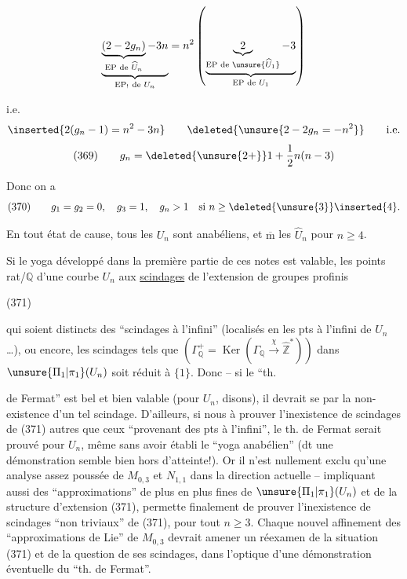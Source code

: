 

\[
\underbrace{\underbrace{(2-2g_n)}_{\text{EP de }\widehat U_n}-3n}_{\text{EP}_{!}\text{ de }U_n}
=n^2\left(\underbrace{\underbrace{2}_{\text{EP de }\unsure{\widehat U_1}}-3}_{\text{EP de }U_1}\right)
\]

i.e.
\[
\inserted{2(g_n-1)=n^2-3n}
\qquad
\deleted{\unsure{2-2g_n=-n^2}}
\qquad \text{i.e.}
\]
\[
\text{(369)}\qquad g_n=\deleted{\unsure{2+}}1+\frac12 n(n-3)
\]

Donc on a
\[
\text{(370)}\qquad g_1=g_2=0,\quad g_3=1,\quad g_n>1\quad\text{si }n\geq\deleted{\unsure{3}}\inserted{4}.
\]

En tout état de cause, tous les $U_n$ sont anabéliens, et $\overline{\mathrm m}$ les $\widehat U_n$ pour $n\geq4$.

Si le yoga  développé dans la première partie de ces notes est valable, les   points rat/$\mathbb Q$ d'une courbe $U_n$   aux \uline{scindages} de l'extension de groupes profinis

\noindent (371)

qui soient distincts des ``scindages à l'infini'' (localisés en les  pts à l'infini de $U_n$\ldots), ou encore, les scindages tels que  $(\Gamma_{\mathbb Q}^{+}=\operatorname{Ker}(\Gamma_{\mathbb Q}\xrightarrow{\chi}\widehat{\mathbb Z}^{*}))$ dans $\unsure{\Pi_1|\pi_1}(U_n)$ soit réduit à $\{1\}$. Donc -- si le ``th.


de Fermat'' est bel et bien valable (pour $U_n$, disons), il devrait se  par la non-existence d'un tel scindage. D'ailleurs, si nous  à prouver l'inexistence de scindages de (371) autres que ceux ``provenant des pts à l'infini'', le th. de Fermat serait prouvé pour $U_n$, même sans avoir établi le ``yoga anabélien'' (dt une démonstration semble bien hors d'atteinte!). Or il n'est nullement exclu qu'une analyse assez poussée de $M_{0,3}$ et $N_{1,1}$ dans la direction actuelle -- impliquant aussi des ``approximations'' de plus en plus fines de $\unsure{\Pi_1|\pi_1}(U_n)$ et de la structure d'extension (371), permette finalement de prouver l'inexistence de scindages ``non triviaux'' de (371), pour tout $n\geq3$. Chaque nouvel affinement des ``approximations de Lie'' de $M_{0,3}$ devrait amener un réexamen de la situation (371) et de la question de ses scindages, dans l'optique d'une démonstration éventuelle du ``th. de Fermat''.

